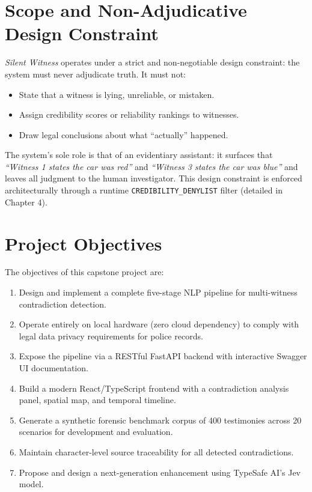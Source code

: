 \documentclass[12pt,a4paper]{report}
\begin{document}
\section{Scope and Non-Adjudicative Design Constraint}

\textit{Silent Witness} operates under a strict and non-negotiable design constraint: the system must never adjudicate truth. It must not:
\begin{itemize}[leftmargin=2cm]
    \item State that a witness is lying, unreliable, or mistaken.
    \item Assign credibility scores or reliability rankings to witnesses.
    \item Draw legal conclusions about what ``actually'' happened.
\end{itemize}

The system's sole role is that of an evidentiary assistant: it surfaces that \textit{``Witness 1 states the car was red''} and \textit{``Witness 3 states the car was blue''} and leaves all judgment to the human investigator. This design constraint is enforced architecturally through a runtime \texttt{CREDIBILITY\_DENYLIST} filter (detailed in Chapter 4).

\section{Project Objectives}

The objectives of this capstone project are:
\begin{enumerate}[leftmargin=2cm]
    \item Design and implement a complete five-stage NLP pipeline for multi-witness contradiction detection.
    \item Operate entirely on local hardware (zero cloud dependency) to comply with legal data privacy requirements for police records.
    \item Expose the pipeline via a RESTful FastAPI backend with interactive Swagger UI documentation.
    \item Build a modern React/TypeScript frontend with a contradiction analysis panel, spatial map, and temporal timeline.
    \item Generate a synthetic forensic benchmark corpus of 400 testimonies across 20 scenarios for development and evaluation.
    \item Maintain character-level source traceability for all detected contradictions.
    \item Propose and design a next-generation enhancement using TypeSafe AI's Jev model.
\end{enumerate}
\end{document}
